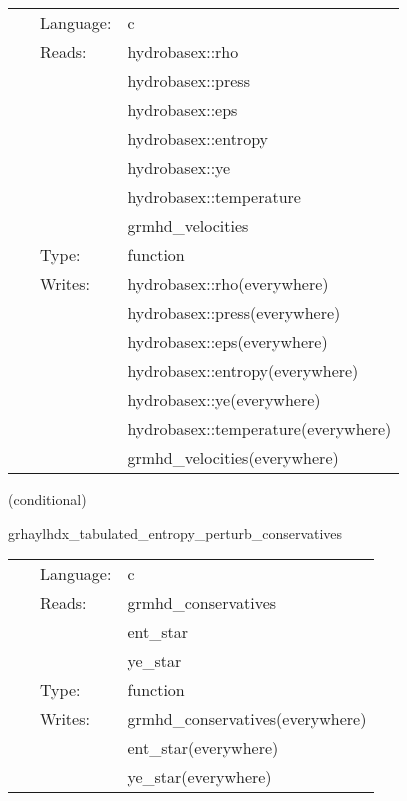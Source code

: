  \begin{tabular*}{160mm}{cll} 
~ & Language:  & c \\ 
~ & Reads:  & hydrobasex::rho \\ 
~& ~ &hydrobasex::press\\ 
~& ~ &hydrobasex::eps\\ 
~& ~ &hydrobasex::entropy\\ 
~& ~ &hydrobasex::ye\\ 
~& ~ &hydrobasex::temperature\\ 
~& ~ &grmhd\_velocities\\ 
~ & Type:  & function \\ 
~ & Writes:  & hydrobasex::rho(everywhere) \\ 
~& ~ &hydrobasex::press(everywhere)\\ 
~& ~ &hydrobasex::eps(everywhere)\\ 
~& ~ &hydrobasex::entropy(everywhere)\\ 
~& ~ &hydrobasex::ye(everywhere)\\ 
~& ~ &hydrobasex::temperature(everywhere)\\ 
~& ~ &grmhd\_velocities(everywhere)\\ 
\end{tabular*} 


\vspace{5mm}

   (conditional) 

\hspace{5mm} grhaylhdx\_tabulated\_entropy\_perturb\_conservatives 

\hspace{5mm}{\it entropy+tabulated version of grhaylhdx\_perturb\_conservatives } 


\hspace{5mm}

 \begin{tabular*}{160mm}{cll} 
~ & Language:  & c \\ 
~ & Reads:  & grmhd\_conservatives \\ 
~& ~ &ent\_star\\ 
~& ~ &ye\_star\\ 
~ & Type:  & function \\ 
~ & Writes:  & grmhd\_conservatives(everywhere) \\ 
~& ~ &ent\_star(everywhere)\\ 
~& ~ &ye\_star(everywhere)\\ 
\end{tabular*} 


